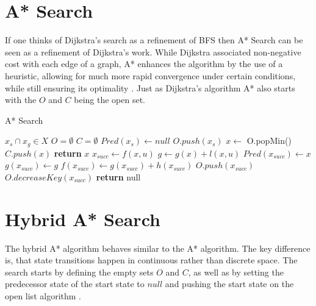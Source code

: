 \section{A* Search}
If one thinks of Dijkstra's search as a refinement of BFS then A* Search can be seen as a refinement of Dijkstra's work. While Dijkstra associated non-negative cost with each edge of a graph, A* enhances the algorithm by the use of a heuristic, allowing for much more rapid convergence under certain conditions, while still ensuring its optimality \cite{Hart.1968}. Just as Dijkstra's algorithm A* also starts with the $O$ and $C$ being the open set.

\begin{algorithm}
    \caption{A* Search}\label{alg:A*}
    \begin{algorithmic}[1]
        \Require $x_s \cap x_g \in X$
        \State $O = \emptyset$
        \State $C = \emptyset$
        \State $Pred(x_s) \gets null$
        \State $O.push(x_s)$
            \State $x \gets$ O.popMin()
            \State $C.push(x)$
                \State \textbf{return} $x$
            \Else
                \State $x_{succ} \gets f(x,u)$
                        \State $g \gets g(x) + l(x,u)$
                            \State $Pred(x_{succ}) \gets x$
                            \State $g(x_{succ}) \gets g$
                            \State $f(x_{succ}) \gets g(x_{succ}) + h(x_{succ})$
                                \State $O.push(x_{succ})$
                            \Else
                                \State $O.decreaseKey(x_{succ})$
                            \EndIf
                        \EndIf
                    \EndIf
                \EndFor
            \EndIf
        \EndWhile
        \State \textbf{return} null
    \end{algorithmic}
\end{algorithm}

\newpage
\section{Hybrid A* Search}
The hybrid A* algorithm behaves similar to the A* algorithm. The key difference is, that state transitions happen in continuous rather than discrete space. The search starts by defining the empty sets $O$ and $C$, as well as by setting the predecessor state of the start state to $null$ and pushing the start state on the open list algorithm .


